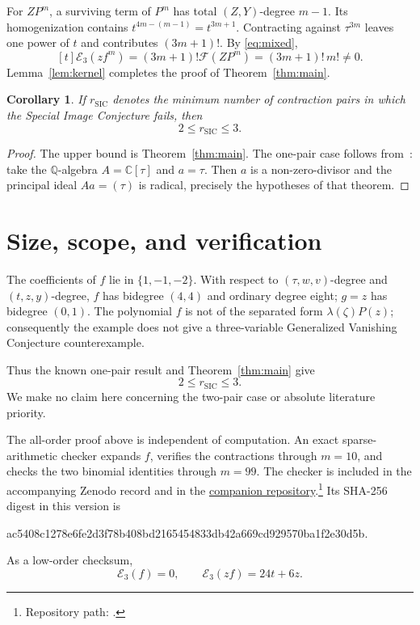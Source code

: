 \documentclass[11pt]{article}
\newtheorem{corollary}[theorem]{Corollary}
\newcommand{\C}{\mathbb C}
\newcommand{\Eop}{\mathcal E}
\begin{document}
For \(ZP^m\), a surviving term of \(P^m\) has total
\((Z,Y)\)-degree \(m-1\).  Its homogenization contains
\(t^{4m-(m-1)}=t^{3m+1}\).  Contracting against \(\tau^{3m}\)
leaves one power of \(t\) and contributes \((3m+1)!\).  By
\eqref{eq:mixed},
\[
 [t]\Eop_3(zf^m)
 =(3m+1)!\mathcal F(ZP^m)
 =(3m+1)!\,m!\neq0.
\]
Lemma~\ref{lem:kernel} completes the proof of
Theorem~\ref{thm:main}.

\begin{corollary}
If \(r_{\mathrm{SIC}}\) denotes the minimum number of contraction pairs
in which the Special Image Conjecture fails, then
\[
 2\leq r_{\mathrm{SIC}}\leq3.
\]
\end{corollary}

\begin{proof}
The upper bound is Theorem~\ref{thm:main}.  The one-pair case follows
from~\cite[Theorem 2.8]{EWZ2011}: take the \(\mathbb Q\)-algebra
\(A=\C[\tau]\) and \(a=\tau\).  Then \(a\) is a non-zero-divisor and
the principal ideal \(Aa=(\tau)\) is radical, precisely the hypotheses
of that theorem.
\end{proof}

\section{Size, scope, and verification}

The coefficients of \(f\) lie in \(\{1,-1,-2\}\).  With respect to
\((\tau,w,v)\)-degree and \((t,z,y)\)-degree, \(f\) has bidegree
\((4,4)\) and ordinary degree eight; \(g=z\) has bidegree \((0,1)\).
The polynomial \(f\) is not of the separated form
\(\lambda(\zeta)P(z)\); consequently the example does not give a
three-variable Generalized Vanishing Conjecture counterexample.

Thus the known one-pair result and Theorem~\ref{thm:main} give
\[
 2\leq r_{\mathrm{SIC}}\leq3.
\]
We make no claim here concerning the two-pair case or absolute
literature priority.

The all-order proof above is independent of computation.  An exact
sparse-arithmetic checker expands \(f\), verifies the contractions
through \(m=10\), and checks the two binomial identities through
\(m=99\).  The checker is included in the accompanying Zenodo record
and in the
\href{https://github.com/royvanrijn/jacobian-research}
{companion repository}.\footnote{Repository path:
.}
Its SHA-256 digest in this version is
\begin{center}
\ttfamily\small
ac5408c1278e6fe2d3f78b408bd2165454833db42a669cd929570ba1f2e30d5b.
\end{center}
As a low-order checksum,
\[
 \Eop_3(f)=0,\qquad \Eop_3(zf)=24t+6z.
\]
\end{document}
